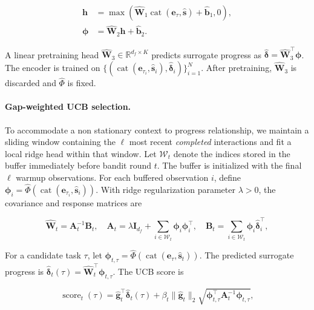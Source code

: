 \documentclass{article} %
\begin{document}
\begin{align*}
    \mathbf{h} &= \max\!\left(\widehat{\mathbf{W}}_1\operatorname{cat}(\mathbf{e}_\tau,\widehat{\mathbf{s}})+\widehat{\mathbf{b}}_1,0\right), \\
    \boldsymbol{\phi} &= \widehat{\mathbf{W}}_2 \mathbf{h} + \widehat{\mathbf{b}}_2.
\end{align*}

A linear pretraining head \(\widehat{\mathbf{W}}_3\in\mathbb{R}^{d_f\times K}\) predicts surrogate progress as \(\widehat{\boldsymbol{\delta}}=\widehat{\mathbf{W}}_3^\top\boldsymbol{\phi}\). The encoder is trained on \(\{(\operatorname{cat}(\mathbf{e}_{\tau_i},\widehat{\mathbf{s}}_i),\widehat{\boldsymbol{\delta}}_i)\}_{i=1}^N\). After pretraining, \(\widehat{\mathbf{W}}_3\) is discarded and \(\widehat\Phi\) is fixed.

\paragraph{Gap-weighted UCB selection.}
To accommodate a non stationary context to progress relationship, we maintain a sliding window containing the \(\ell\) most recent \emph{completed} interactions and fit a local ridge head within that window. Let \(\mathcal{W}_t\) denote the indices stored in the buffer immediately before bandit round \(t\). The buffer is initialized with the final \(\ell\) warmup observations. For each buffered observation \(i\), define \(\boldsymbol{\phi}_i=\widehat\Phi(\operatorname{cat}(\mathbf{e}_{\tau_i},\widehat{\mathbf{s}}_i))\). With ridge regularization parameter \(\lambda>0\), the covariance and response matrices are

\[
    \widehat{\mathbf{W}}_t = \mathbf{A}_t^{-1}\mathbf{B}_t,
    \quad
    \mathbf{A}_t = \lambda \mathbf{I}_{d_f} + \sum_{i \in \mathcal{W}_t} \boldsymbol{\phi}_{i}\boldsymbol{\phi}_{i}^\top,
    \quad
    \mathbf{B}_t = \sum_{i \in \mathcal{W}_t} \boldsymbol{\phi}_{i} \widehat{\boldsymbol{\delta}}_{i}^\top,
\]

For a candidate task \(\tau\), let \(\boldsymbol{\phi}_{t,\tau}=\widehat\Phi(\operatorname{cat}(\mathbf{e}_\tau,\widehat{\mathbf{s}}_t))\). The predicted surrogate progress is \(\widehat{\boldsymbol{\delta}}_t(\tau)=\widehat{\mathbf{W}}_t^\top\boldsymbol{\phi}_{t,\tau}\). The UCB score is

\[
    \operatorname{score}_t(\tau) = \widehat{\mathbf{g}}_t^\top \widehat{\boldsymbol{\delta}}_t(\tau) + \beta_t\lVert\widehat{\mathbf{g}}_t\rVert_2\sqrt{\boldsymbol{\phi}_{t,\tau}^\top\mathbf{A}_t^{-1}\boldsymbol{\phi}_{t,\tau}},
\]
\end{document}
